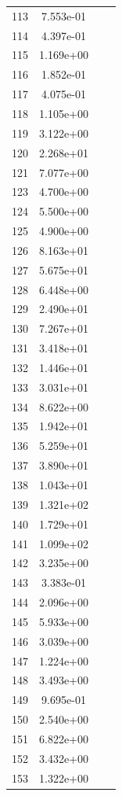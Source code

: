 \documentclass[12pt]{article}
\begin{document}
\begin{longtable}{@{}cccc@{}}
113 & 7.553e-01 &  &  \\
114 & 4.397e-01 &  &  \\
115 & 1.169e+00 &  &  \\
116 & 1.852e-01 &  &  \\
117 & 4.075e-01 &  &  \\
118 & 1.105e+00 &  &  \\
119 & 3.122e+00 &  &  \\
120 & 2.268e+01 &  &  \\
121 & 7.077e+00 &  &  \\
123 & 4.700e+00 &  &  \\
124 & 5.500e+00 &  &  \\
125 & 4.900e+00 &  &  \\
126 & 8.163e+01 &  &  \\
127 & 5.675e+01 &  &  \\
128 & 6.448e+00 &  &  \\
129 & 2.490e+01 &  &  \\
130 & 7.267e+01 &  &  \\
131 & 3.418e+01 &  &  \\
132 & 1.446e+01 &  &  \\
133 & 3.031e+01 &  &  \\
134 & 8.622e+00 &  &  \\
135 & 1.942e+01 &  &  \\
136 & 5.259e+01 &  &  \\
137 & 3.890e+01 &  &  \\
138 & 1.043e+01 &  &  \\
139 & 1.321e+02 &  &  \\
140 & 1.729e+01 &  &  \\
141 & 1.099e+02 &  &  \\
142 & 3.235e+00 &  &  \\
143 & 3.383e-01 &  &  \\
144 & 2.096e+00 &  &  \\
145 & 5.933e+00 &  &  \\
146 & 3.039e+00 &  &  \\
147 & 1.224e+00 &  &  \\
148 & 3.493e+00 &  &  \\
149 & 9.695e-01 &  &  \\
150 & 2.540e+00 &  &  \\
151 & 6.822e+00 &  &  \\
152 & 3.432e+00 &  &  \\
153 & 1.322e+00 &  &  \\

\end{longtable}
\end{document}
